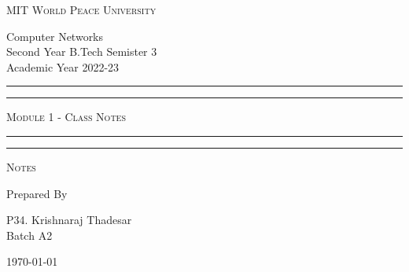 \documentclass[11pt]{article}
\begin{document}
\begin{titlepage}
	\centering


	\huge\textsc{
		MIT World Peace University
	}\\

	\vspace{0.75\baselineskip} %

	\LARGE{
		Computer Networks\\
		Second Year B.Tech Semister 3\\
		Academic Year 2022-23
	}

	\vfill %


	\rule{\textwidth}{1.6pt}\vspace*{-\baselineskip}\vspace*{2pt}
	\rule{\textwidth}{0.6pt}
	\vspace{0.75\baselineskip} %



	\huge{\textsc{
			Module 1 - Class Notes
		}} \\



	\vspace{0.5\baselineskip} %
	\rule{\textwidth}{0.6pt}\vspace*{-\baselineskip}\vspace*{2.8pt}
	\rule{\textwidth}{1.6pt}

	\vspace{1\baselineskip} %


	\LARGE\textsc{
		Notes
	} %
	\vfill


	Prepared By
	\vspace{0.5\baselineskip} %

	\Large{
		P34. Krishnaraj Thadesar\\
		\vspace{1cm}
		Batch A2
	}


	\vspace{0.5\baselineskip} %
	\today

\end{titlepage}
\end{document}
